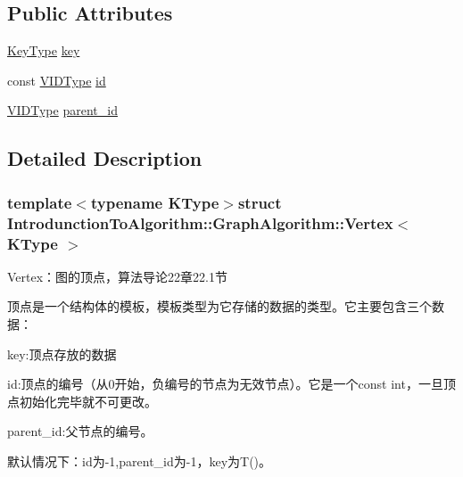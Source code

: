 \subsection*{Public Attributes}
\begin{DoxyCompactItemize}
\item 
\hyperlink{struct_introdunction_to_algorithm_1_1_graph_algorithm_1_1_vertex_ada86f69d9e5f5dcb47b7be1e3a208d06}{Key\+Type} \hyperlink{struct_introdunction_to_algorithm_1_1_graph_algorithm_1_1_vertex_ab85342bae9a63d83eff811557c07e58e}{key}
\item 
const \hyperlink{struct_introdunction_to_algorithm_1_1_graph_algorithm_1_1_vertex_ac1913974a4b8371c5a896b098ebf152e}{V\+I\+D\+Type} \hyperlink{struct_introdunction_to_algorithm_1_1_graph_algorithm_1_1_vertex_a7010bd64e704f2d210c37007d30fbfa9}{id}
\item 
\hyperlink{struct_introdunction_to_algorithm_1_1_graph_algorithm_1_1_vertex_ac1913974a4b8371c5a896b098ebf152e}{V\+I\+D\+Type} \hyperlink{struct_introdunction_to_algorithm_1_1_graph_algorithm_1_1_vertex_ac812f623d4955401f9e2c8f45b4d434d}{parent\+\_\+id}
\end{DoxyCompactItemize}


\subsection{Detailed Description}
\subsubsection*{template$<$typename K\+Type$>$struct Introdunction\+To\+Algorithm\+::\+Graph\+Algorithm\+::\+Vertex$<$ K\+Type $>$}

Vertex：图的顶点，算法导论22章22.1节 

顶点是一个结构体的模板，模板类型为它存储的数据的类型。它主要包含三个数据：


\begin{DoxyItemize}
\item {\ttfamily key}\+:顶点存放的数据
\item {\ttfamily id}\+:顶点的编号（从0开始，负编号的节点为无效节点）。它是一个{\ttfamily const int}，一旦顶点初始化完毕就不可更改。
\item {\ttfamily parent\+\_\+id}\+:父节点的编号。
\end{DoxyItemize}

默认情况下：{\ttfamily id}为-\/1,{\ttfamily parent\+\_\+id}为-\/1，{\ttfamily key}为{\ttfamily T()}。 


